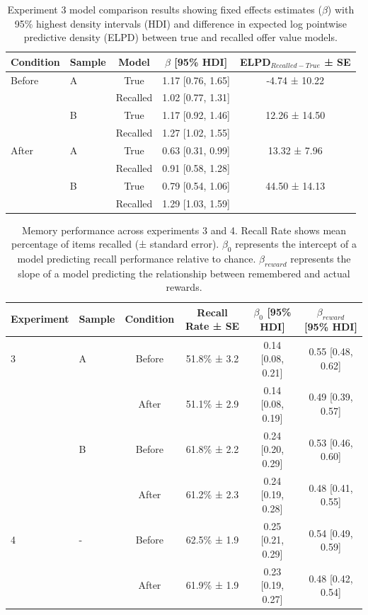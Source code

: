 \documentclass[10pt,letterpaper]{article}
\begin{document}
\begin{table}[t]
\centering
\begin{tabular}{llccc}
\hline
Condition & Sample & Model & $\beta$ [95\% HDI] & ELPD$_{Recalled-True}$ ± SE \\
\hline
Before & A & True & 1.17 [0.76, 1.65] & -4.74 ± 10.22 \\
       &   & Recalled & 1.02 [0.77, 1.31] & \\
       & B & True & 1.17 [0.92, 1.46] & 12.26 ± 14.50 \\
       &   & Recalled & 1.27 [1.02, 1.55] & \\
\hline
After  & A & True & 0.63 [0.31, 0.99] & 13.32 ± 7.96 \\
       &   & Recalled & 0.91 [0.58, 1.28] & \\
       & B & True & 0.79 [0.54, 1.06] & 44.50 ± 14.13 \\
       &   & Recalled & 1.29 [1.03, 1.59] & \\
\hline
\end{tabular}
\caption{Experiment 3 model comparison results showing fixed effects estimates ($\beta$) with 95\% highest density intervals (HDI) and difference in expected log pointwise predictive density (ELPD) between true and recalled offer value models.}
\label{tab:modelcomparison}
\end{table}

\begin{table}[t]
\centering
\begin{tabular}{llcccc}
\hline
Experiment & Sample & Condition & Recall Rate ± SE & $\beta_0$ [95\% HDI] & $\beta_{reward}$ [95\% HDI] \\
\hline
3 & A & Before & 51.8\% ± 3.2 & 0.14 [0.08, 0.21] & 0.55 [0.48, 0.62] \\
  &   & After & 51.1\% ± 2.9 & 0.14 [0.08, 0.19] & 0.49 [0.39, 0.57] \\
  & B & Before & 61.8\% ± 2.2 & 0.24 [0.20, 0.29] & 0.53 [0.46, 0.60] \\
  &   & After & 61.2\% ± 2.3 & 0.24 [0.19, 0.28] & 0.48 [0.41, 0.55] \\
4 & - & Before & 62.5\% ± 1.9 & 0.25 [0.21, 0.29] & 0.54 [0.49, 0.59] \\
  &   & After & 61.9\% ± 1.9 & 0.23 [0.19, 0.27] & 0.48 [0.42, 0.54] \\
\hline
\end{tabular}
\caption{Memory performance across experiments 3 and 4. Recall Rate shows mean percentage of items recalled (± standard error). $\beta_0$ represents the intercept of a model predicting recall performance relative to chance. $\beta_{reward}$ represents the slope of a model predicting the relationship between remembered and actual rewards.}
\label{tab:memory}
\end{table}
\end{document}
